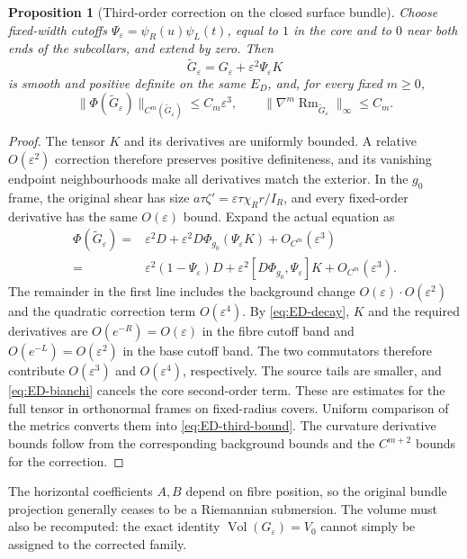 \documentclass[a4paper,11pt]{article}
\numberwithin{equation}{section}
\newtheorem{proposition}[theorem]{Proposition}
\theoremstyle{definition}
\newcommand{\Rm}{\operatorname{Rm}}
\newcommand{\Vol}{\operatorname{Vol}}
\begin{document}
\begin{proposition}[Third-order correction on the closed surface bundle]\label{prop:ED-third}
Choose fixed-width cutoffs $\Psi_\varepsilon=\psi_R(u)\psi_L(t)$,
equal to $1$ in the core and to $0$ near both ends of the subcollars, and extend by zero.
Then
\begin{equation}\label{eq:ED-corrected}
\widetilde G_\varepsilon=G_\varepsilon+\varepsilon^2\Psi_\varepsilon K
\end{equation}
is smooth and positive definite on the same $E_D$, and, for every fixed $m\ge0$,
\begin{equation}\label{eq:ED-third-bound}
\|\Phi(\widetilde G_\varepsilon)\|_{C^m(\widetilde G_\varepsilon)}
\le C_m\varepsilon^3,\qquad
\|\nabla^m\Rm_{\widetilde G_\varepsilon}\|_\infty\le C_m.
\end{equation}
\end{proposition}
\begin{proof}
The tensor $K$ and its derivatives are uniformly bounded. A relative $O(\varepsilon^2)$ correction therefore preserves positive definiteness,
and its vanishing endpoint neighbourhoods make all derivatives match the exterior.
In the $g_0$ frame, the original shear has size
$a\tau\zeta'=\varepsilon\tau\chi_Rr/I_R$,
and every fixed-order derivative has the same $O(\varepsilon)$ bound.
Expand the actual equation as
\[
\begin{split}
\Phi(\widetilde G_\varepsilon)
={}&\varepsilon^2D+\varepsilon^2D\Phi_{g_0}(\Psi_\varepsilon K)
+O_{C^m}(\varepsilon^3)\\
={}&\varepsilon^2(1-\Psi_\varepsilon)D
+\varepsilon^2[D\Phi_{g_0},\Psi_\varepsilon]K
+O_{C^m}(\varepsilon^3).
\end{split}
\]
The remainder in the first line includes the background change $O(\varepsilon)\cdot O(\varepsilon^2)$
and the quadratic correction term $O(\varepsilon^4)$.
By \eqref{eq:ED-decay}, $K$ and the required derivatives are
$O(e^{-R})=O(\varepsilon)$ in the fibre cutoff band and
$O(e^{-L})=O(\varepsilon^2)$ in the base cutoff band.
The two commutators therefore contribute $O(\varepsilon^3)$ and $O(\varepsilon^4)$, respectively.
The source tails are smaller, and \eqref{eq:ED-bianchi} cancels the core second-order term.
These are estimates for the full tensor in orthonormal frames on fixed-radius covers.
Uniform comparison of the metrics converts them into \eqref{eq:ED-third-bound}.
The curvature derivative bounds follow from the corresponding background bounds and the $C^{m+2}$ bounds for the correction.
\end{proof}
The horizontal coefficients $A,B$ depend on fibre position, so the original bundle projection generally ceases to be a Riemannian submersion.
The volume must also be recomputed: the exact identity $\Vol(G_\varepsilon)=V_0$ cannot simply be assigned to the corrected family.
\end{document}

